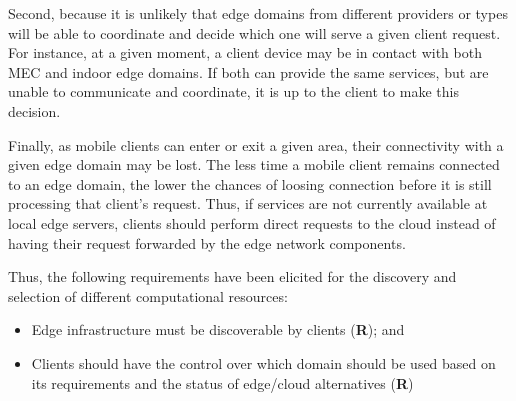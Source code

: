 Second, because it is unlikely that edge domains from different providers or types will be able to coordinate and decide which one will serve a given client request. For instance, at a given moment, a client device may be in contact with both MEC and indoor edge domains. If both can provide the same services, but are unable to communicate and coordinate, it is up to the client to make this decision.





Finally, as mobile clients can enter or exit a given area, their connectivity with a given edge domain may be lost. The less time a mobile client remains connected to an edge domain, the lower the chances of loosing connection before it is still processing that client's request. Thus, if services are not currently available at local edge servers, clients should perform direct requests to the cloud instead of having their request forwarded by the edge network components. 


Thus, the following requirements have been elicited for the discovery and selection of different computational resources:


\begin{itemize}

	\item Edge infrastructure must be discoverable by clients (\textbf{R}); and

	\item Clients should have the control over which domain should be used based on its requirements and the status of edge/cloud alternatives (\textbf{R})

\end{itemize}

